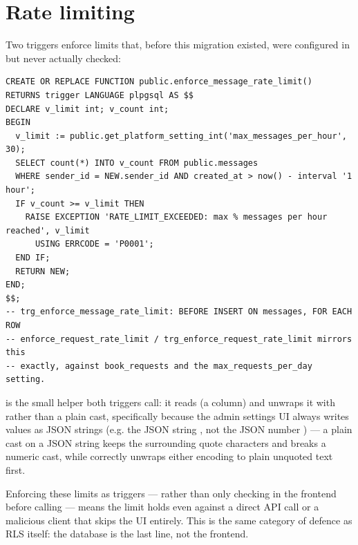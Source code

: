 \section{Rate limiting}

Two  triggers enforce limits that, before this migration existed, were configured in  but never actually checked:

\begin{lstlisting}[style=olkcodesql, caption={enforce\_message\_rate\_limit — reads its own limit from platform\_settings}]
CREATE OR REPLACE FUNCTION public.enforce_message_rate_limit()
RETURNS trigger LANGUAGE plpgsql AS $$
DECLARE v_limit int; v_count int;
BEGIN
  v_limit := public.get_platform_setting_int('max_messages_per_hour', 30);
  SELECT count(*) INTO v_count FROM public.messages
  WHERE sender_id = NEW.sender_id AND created_at > now() - interval '1 hour';
  IF v_count >= v_limit THEN
    RAISE EXCEPTION 'RATE_LIMIT_EXCEEDED: max % messages per hour reached', v_limit
      USING ERRCODE = 'P0001';
  END IF;
  RETURN NEW;
END;
$$;
-- trg_enforce_message_rate_limit: BEFORE INSERT ON messages, FOR EACH ROW
-- enforce_request_rate_limit / trg_enforce_request_rate_limit mirrors this
-- exactly, against book_requests and the max_requests_per_day setting.
\end{lstlisting}

 is the small helper both triggers call: it reads  (a  column) and unwraps it with  rather than a plain  cast, specifically because the admin settings UI always writes values as JSON strings (e.g. the JSON string , not the JSON number ) — a plain  cast on a JSON string keeps the surrounding quote characters and breaks a numeric cast, while  correctly unwraps either encoding to plain unquoted text first.

\begin{olknote}
Enforcing these limits as  triggers — rather than only checking in the frontend before calling  — means the limit holds even against a direct API call or a malicious client that skips the UI entirely. This is the same category of defence as RLS itself: the database is the last line, not the frontend.
\end{olknote}

